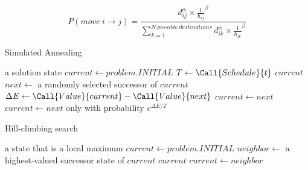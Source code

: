 \documentclass[exam={Midterm},color=true]{cs581exam}
\begin{document}
\[ P(move\ i\rightarrow j) = \frac{d_{ij}^{\alpha}\times\frac{1}{h_{ij}}^{\beta}}{\sum_{k=1}^{N\ possible\ destinations} d_{ik}^{\alpha}\times\frac{1}{h_{ik}}^{\beta}} \]

\begin{algorithm}[H]
	\caption{Simulated Annealing}\label{alg:simulated-annealing}
	\begin{algorithmic}[1]
		 \Returns a solution state
		\State $current\gets problem.INITIAL$
			\State $T\gets\Call{Schedule}{t}$
				\Return $current$
			\EndIf
			\State $next\gets$ a randomly selected successor of $current$
			\State $\Delta E\gets\Call{Value}{current} - \Call{Value}{next}$
				$current\gets next$
			\Else\
			$current\gets next$ only with probability $e^{\Delta E/T}$
			\EndIf
		\EndFor
		\EndFunction
	\end{algorithmic}
\end{algorithm}
%
\begin{algorithm}[H]
	\caption{Hill-climbing search}\label{alg:hill-climbing}
	\begin{algorithmic}[1]
		 \Returns a state that is a local maximum
		\State $current\gets problem.INITIAL$
			\State $neighbor\gets$ a highest-valued successor state of $current$
				\Return $current$
			\EndIf
			\State $current\gets neighbor$
		\EndWhile
		\EndFunction
	\end{algorithmic}
\end{algorithm}
%
\end{document}
